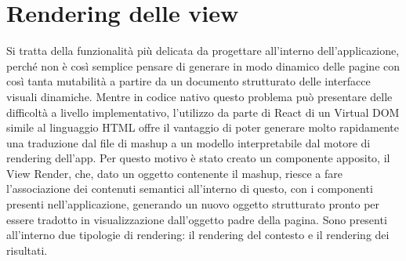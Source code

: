 \section{Rendering delle view}\label{sec:rendering-view}

Si tratta della funzionalità più delicata da progettare all'interno dell'applicazione, perché non è così semplice pensare di generare in modo dinamico delle pagine con così tanta mutabilità a partire da un documento strutturato delle interfacce visuali dinamiche.
Mentre in codice nativo questo problema può presentare delle difficoltà a livello implementativo, l'utilizzo da parte di React di un Virtual DOM simile al linguaggio HTML offre il vantaggio di poter generare molto rapidamente una traduzione dal file di mashup a un modello interpretabile dal motore di rendering dell'app.
Per questo motivo è stato creato un componente apposito, il View Render, che, dato un oggetto contenente il mashup, riesce a fare l'associazione dei contenuti semantici all'interno di questo, con i componenti presenti nell'applicazione, generando un nuovo oggetto strutturato pronto per essere tradotto in visualizzazione dall'oggetto padre della pagina.
Sono presenti all'interno due tipologie di rendering: il rendering del contesto e il rendering dei risultati.

